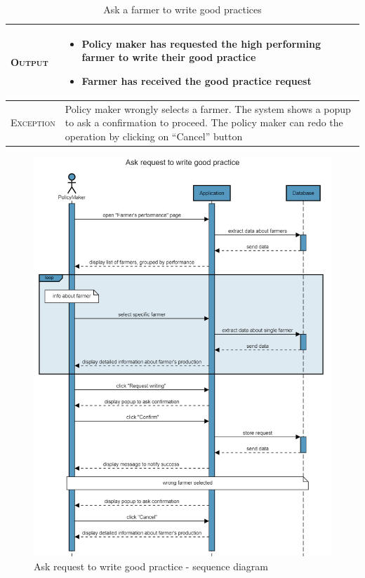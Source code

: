 \begin{table}[H]
\begin{tabular}{|l|p{}|}
    	\hline %
    	\textsc{Output}             &  \begin{itemize}
    	    \item Policy maker has requested the high performing farmer to write their good practice
    	    \item Farmer has received the good practice request
    	\end{itemize}\\
    	\hline %
    	\textsc{Exception}         &  Policy maker wrongly selects a farmer. The 
    	system shows a popup to ask a confirmation to proceed. The policy maker can redo the operation by clicking on “Cancel” button\\
    	\hline %
        
    \end{tabular}
    \caption{\label{tab:visualize_iprovement}Ask a farmer to write good practices} 
\end{table}

\begin{figure}[H]
    \centering
    \includegraphics[scale=0.5]{Images/Sequence diagrams/SE2 - Ask request to write good practice (pm).png}
    \caption{Ask request to write good practice - sequence diagram}
    \label{fig:my_label}
\end{figure}


